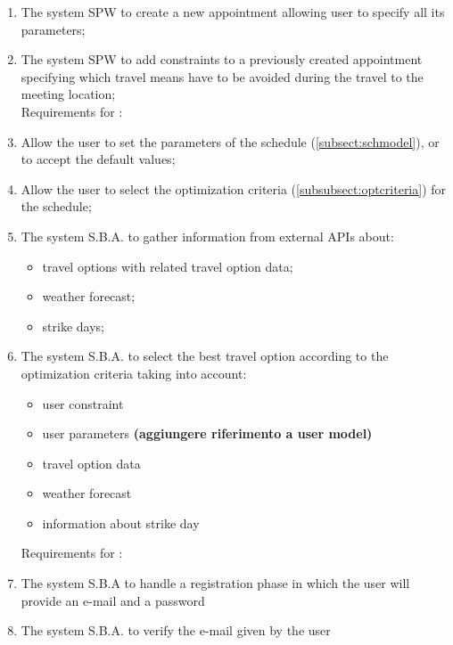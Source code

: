 \begin{enumerate}
\renewcommand\labelenumi{\textbf{R\theenumi}}

\item The system SPW to create a new appointment allowing user to specify all its parameters; \label{req:R1}

\item The system SPW to add constraints to a previously created appointment specifying which travel means have to be avoided during the travel to the meeting location; \label{req:R2}
\\


Requirements for :

\item Allow the user to set the parameters of the schedule (\ref{subsect:schmodel}), or to accept the default values;
 
\item Allow the user to select the optimization criteria (\ref{subsubsect:optcriteria}) for the schedule;

\item The system S.B.A. to gather information from external APIs about: 
\begin{itemize}
\item travel options with related travel option data;
\item weather forecast;
\item strike days;
\end{itemize}

\item The system S.B.A. to select the best travel option according to the optimization criteria taking into account:
\begin{itemize}
\item user constraint
\item user parameters \textbf{(aggiungere riferimento a user model)}
\item travel option data 
\item weather forecast
\item information about strike day
\end{itemize}

Requirements for :

\item The system S.B.A to handle a registration phase in which the user will provide an e-mail and a password

\item The system S.B.A. to verify the e-mail given by the user


\end{enumerate}
